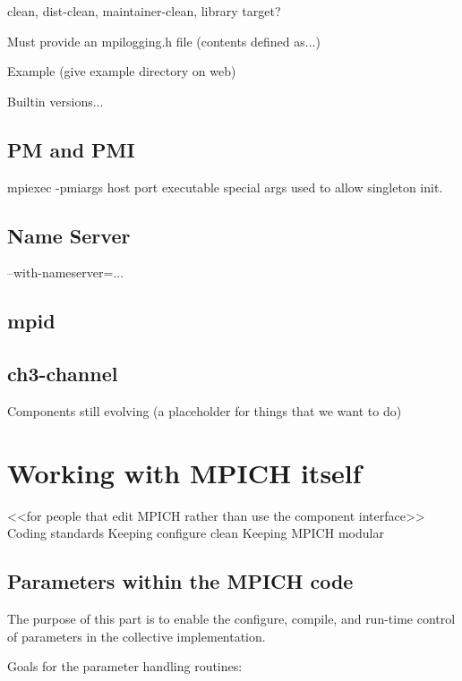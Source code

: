 \documentclass{report}
\begin{document}
    clean, dist-clean, maintainer-clean, library target?

    Must provide an mpilogging.h file (contents defined as...)

    Example (give example directory on web)

    Builtin versions...

\section{PM and PMI}

mpiexec 
    -pmiargs host port executable
special args used to allow singleton init.

\section{Name Server}

    --with-nameserver=...

\section{mpid}
\section{ch3-channel}

          Components still evolving (a placeholder for things that we want to do)

\chapter{Working with MPICH itself}
          <<for people that edit MPICH rather than use the component interface>>
          Coding standards
          Keeping configure clean
          Keeping MPICH modular
          

\section{Parameters within the MPICH code}

   The purpose of this part is to enable the configure, compile, and
   run-time control of parameters in the collective implementation.

   Goals for the parameter handling routines:
\end{document}
